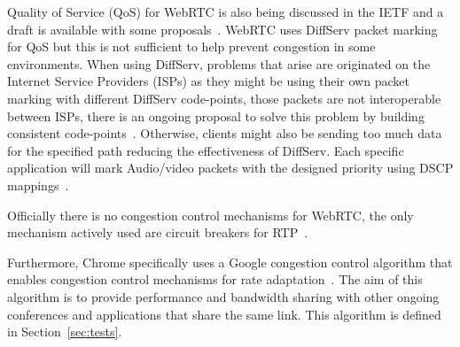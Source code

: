Quality of Service (QoS)  for WebRTC is also being discussed in the IETF and a draft is available with some proposals~\cite{qosWebRTCIETF}. WebRTC uses DiffServ packet marking for QoS but this is not sufficient to help prevent congestion in some environments. When using DiffServ, problems that arise are originated on the Internet Service Providers (ISPs) as they might be using their own packet marking with different DiffServ code-points, those packets are not interoperable between ISPs, there is an ongoing proposal to solve this problem by building consistent code-points~\cite{diffservIETF}. Otherwise, clients might also be sending too much data for the specified path reducing the effectiveness of DiffServ. Each specific application will mark Audio/video packets with the designed priority using DSCP mappings~\cite{qosWebRTCIETF}. 

Officially there is no congestion control mechanisms for WebRTC, the only mechanism actively used are circuit breakers for RTP~\cite{circuitbreakers}.

Furthermore, Chrome specifically uses a Google congestion control algorithm that enables congestion control mechanisms for rate adaptation~\cite{alvestrandCongestion2012}. The aim of this algorithm is to provide performance and bandwidth sharing with other ongoing conferences and applications that share the same link. This algorithm is defined in Section~\ref{sec:tests}.


